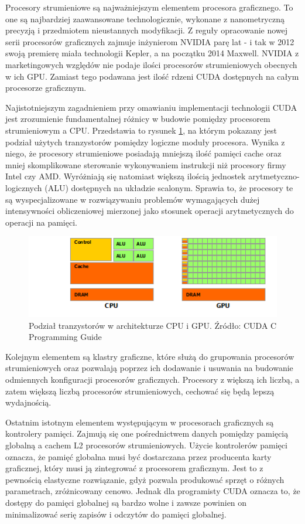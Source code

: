 Procesory strumieniowe są najważniejszym elementem procesora graficznego. To one
są najbardziej zaawansowane technologicznie, wykonane z nanometryczną
precyzją i przedmiotem nieustannych modyfikacji. Z reguły opracowanie nowej
serii procesorów graficznych zajmuje inżynierom NVIDIA parę lat - i tak w 2012
swoją premierę miała technologii Kepler, a na początku 2014 Maxwell. NVIDIA z
marketingowych względów nie podaje ilości procesorów strumieniowych obecnych w ich GPU. Zamiast tego
podawana jest ilość rdzeni CUDA dostępnych na całym procesorze graficznym.

Najistotniejszym zagadnieniem przy omawianiu implementacji technologii CUDA jest
zrozumienie fundamentalnej różnicy w budowie pomiędzy procesorem strumieniowym a
CPU. Przedstawia to rysunek \ref{cpugpu}, na którym pokazany jest podział
użytych tranzystorów pomiędzy logiczne moduły procesora.  Wynika z
niego, że procesory strumieniowe posiadają mniejszą ilość pamięci cache oraz
mniej skomplikowane sterowanie wykonywaniem instrukcji niż procesory firmy Intel
czy AMD. Wyróżniają się natomiast większą ilością jednostek
arytmetyczno-logicznych (ALU) dostępnych na układzie scalonym. Sprawia to, że
procesory te są wyspecjalizowane w rozwiązywaniu problemów wymagających dużej
intensywności obliczeniowej mierzonej jako stosunek operacji arytmetycznych do
operacji na pamięci.

\begin{figure}[H]
\centering
\includegraphics{images/gpu-devotes-more-transistors-to-data-processing.png}
\caption{Podział tranzystorów w architekturze CPU i GPU. Źródło: CUDA C Programming Guide}
\label{cpugpu}
\end{figure}

Kolejnym elementem są klastry graficzne, które służą do grupowania procesorów
strumieniowych oraz pozwalają poprzez ich dodawanie i usuwania na budowanie
odmiennych konfiguracji procesorów graficznych\cite{gf680}. Procesory z większą
ich liczbą, a zatem większą liczbą procesorów strumieniowych, cechować się będą
lepszą wydajnością.

Ostatnim istotnym elementem występującym w procesorach graficznych są kontrolery
pamięci. Zajmują się one pośrednictwem danych pomiędzy pamięcią globalną a
cachem L2 procesorów strumieniowych. Użycie kontrolerów pamięci oznacza, że
pamięć globalna musi być dostarczana przez producenta karty graficznej,
	który musi ją zintegrować z procesorem graficznym. Jest to z
	pewnością elastyczne rozwiązanie, gdyż pozwala produkować sprzęt o różnych
	parametrach, zróżnicowany cenowo. Jednak dla programisty CUDA oznacza to, że
	dostępy do pamięci globalnej są bardzo wolne i
	zawsze powinien on minimalizować serię zapisów i odczytów do pamięci
	globalnej.

